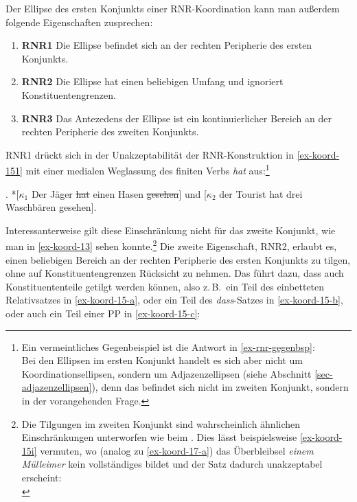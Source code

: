 Der Ellipse des ersten Konjunkts einer RNR-Koordination kann man au\ss erdem folgende Eigenschaften zusprechen:
\begin{enumerate}
  \item[] {\bf RNR1} Die Ellipse befindet sich an der rechten Peripherie des ersten Konjunkts.
  \item[] {\bf RNR2} Die Ellipse hat einen beliebigen Umfang und ignoriert Konstituentengrenzen.
  \item[] {\bf RNR3} Das Antezedens der Ellipse ist ein kontinuierlicher Bereich an der rechten Peripherie des zweiten Konjunkts.  
\end{enumerate}
RNR1 drückt sich in der Unakzeptabilität der RNR-Konstruktion in \ref{ex-koord-151} mit einer medialen Weglassung des finiten Verbs {\it hat} aus:\footnote{Ein vermeintliches Gegenbeispiel ist die Antwort in \ref{ex-rnr-gegenbsp}:\\
Bei den Ellipsen im ersten Konjunkt handelt es sich aber nicht um Koordinationsellipsen, sondern um Adjazenzellipsen (siehe Abschnitt \ref{sec-adjazenzellipsen}), denn das  befindet sich nicht im zweiten Konjunkt, sondern in der vorangehenden Frage.}

\ex. *[$\kappa_1$ Der Jäger \sout{hat} einen Hasen \sout{gesehen}] und [$\kappa_2$ der Tourist hat drei Waschbären gesehen].\label{ex-koord-151}

Interessanterweise gilt diese Einschränkung nicht für das zweite Konjunkt, wie man in \ref{ex-koord-13} sehen konnte.\footnote{Die Tilgungen im zweiten Konjunkt sind wahrscheinlich ähnlichen Einschränkungen unterworfen wie beim . Dies lässt beispielsweise \ref{ex-koord-15i} vermuten, wo (analog zu \ref{ex-koord-17-a}) das Überbleibsel {\it einem Mülleimer} kein vollständiges  bildet und der Satz dadurch unakzeptabel erscheint:\\  
\fnex{
\ex. *\label{ex-koord-15i}[$\kappa_1$ Hinter einer Mülltonne hat sich Karl \sout{versteckt} und [$\kappa_2$ \sout{hinter} einem Mülleimer \sout{hat sich} Peter versteckt].

}} Die zweite Eigenschaft, RNR2, erlaubt es, einen beliebigen Bereich an der rechten Peripherie des ersten Konjunkts zu tilgen, ohne auf Konstituentengrenzen Rücksicht zu nehmen. Das führt dazu, dass auch Konstituententeile getilgt werden können, also z.\,B.\  ein Teil des einbetteten Relativsatzes in \ref{ex-koord-15-a}, oder ein Teil des \emph{dass}-Satzes in \ref{ex-koord-15-b}, oder auch ein Teil einer PP in \ref{ex-koord-15-c}:  

